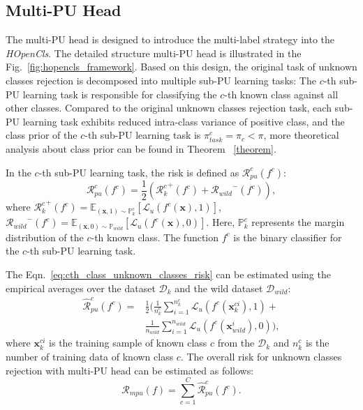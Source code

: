 \subsection{Multi-PU Head}

The multi-PU head is designed to introduce the multi-label strategy into the \textit{HOpenCls}. The detailed structure multi-PU head is illustrated in the Fig.~\ref{fig:hopencls_framework}. Based on this design, the original task of unknown classes rejection is decomposed into multiple sub-PU learning tasks: The $c$-th sub-PU learning task is responsible for classifying the $c$-th known class against all other classes. Compared to the original unknown classes rejection task, each sub-PU learning task exhibits reduced intra-class variance of positive class, and the class prior of the $c$-th sub-PU learning task is $\pi_{task}^{c}=\pi_{c}<\pi$, more theoretical analysis about class prior can be found in Theorem ~\ref{theorem}.

In the $c$-th sub-PU learning task, the risk is defined as $\mathcal{R}_{pu}^{c}(f^{c})$:
\begin{equation}
    \mathcal{R}_{pu}^{c}(f^c)=\frac{1}{2}\left({\mathcal{R}^{c}_{k}}^{+}(f^c)+{\mathcal{R}_{wild}}^{-}(f^c)\right),
    \label{eq:cth_class_unknown_classes_risk}
\end{equation}
where ${\mathcal{R}^{c}_{k}}^{+}(f^c)=\mathbb{E}_{(\boldsymbol{x},1){\sim}{\mathbb{P}_{k}^{c}}}\left[\mathcal{L}_{u}(f^{c}(\boldsymbol{x}),1)\right]$, ${\mathcal{R}_{wild}}^{-}(f^c)=\mathbb{E}_{(\boldsymbol{x},0){\sim}{\mathbb{P}_{wild}}}\left[\mathcal{L}_{u}(f^{c}(\boldsymbol{x}),0)\right]$. Here, $\mathbb{P}_{k}^{c}$ represents the margin distribution of the $c$-th known class. The function $f^{c}$ is the binary classifier for the $c$-th sub-PU learning task.

The Eqn.~\ref{eq:cth_class_unknown_classes_risk} can be estimated using the empirical averages over the dataset $\mathcal{D}_{k}$ and the wild dataset $\mathcal{D}_{wild}$:
\begin{equation}
    \begin{aligned}
        \hat{\mathcal{R}}_{pu}^{c}(f^c)=&\frac{1}{2}(\frac{1}{n_{k}^{c}}\sum_{i=1}^{n_{k}^{c}}\mathcal{L}_{u}(f^{c}(\boldsymbol{x}^{ci}_{k}),1)+\\&\frac{1}{n_{wild}}\sum_{i=1}^{n_{wild}}\mathcal{L}_{u}(f^{c}(\boldsymbol{x}^{i}_{wild}),0)),
    \end{aligned}
    \label{eq:cth_class_unknown_classes_average_loss}
\end{equation}
where $\boldsymbol{x}^{ci}_{k}$ is the training sample of known class $c$ from the $\mathcal{D}_{k}$ and $n_{k}^{c}$ is the number of training data of known class $c$. The overall risk for unknown classes rejection with multi-PU head can be estimated as follows:
\begin{equation}
    \hat{\mathcal{R}}_{mpu}(f)=\sum_{c=1}^{C}\hat{\mathcal{R}}_{pu}^{c}(f^{c}).
    \label{eq:unknown_classes_risk_multi_pu_head_average_loss}
\end{equation}

